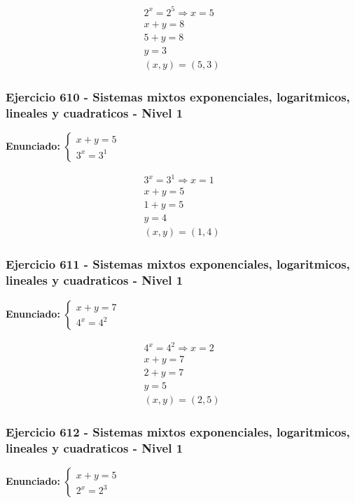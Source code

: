 \documentclass[12pt,a4paper]{article}
\begin{document}
\[
\begin{aligned}
2^x=2^{5}\Rightarrow x=5\\
x+y=8\\
5+y=8\\
y=3\\
\boxed{(x,y)=(5,3)}
\end{aligned}
\]


\subsubsection*{Ejercicio 610 - Sistemas mixtos exponenciales, logaritmicos, lineales y cuadraticos - Nivel 1}
\textbf{Enunciado:} \(\begin{cases} x+y=5\\ 3^x=3^{1}\end{cases}\)

\[
\begin{aligned}
3^x=3^{1}\Rightarrow x=1\\
x+y=5\\
1+y=5\\
y=4\\
\boxed{(x,y)=(1,4)}
\end{aligned}
\]


\subsubsection*{Ejercicio 611 - Sistemas mixtos exponenciales, logaritmicos, lineales y cuadraticos - Nivel 1}
\textbf{Enunciado:} \(\begin{cases} x+y=7\\ 4^x=4^{2}\end{cases}\)

\[
\begin{aligned}
4^x=4^{2}\Rightarrow x=2\\
x+y=7\\
2+y=7\\
y=5\\
\boxed{(x,y)=(2,5)}
\end{aligned}
\]


\subsubsection*{Ejercicio 612 - Sistemas mixtos exponenciales, logaritmicos, lineales y cuadraticos - Nivel 1}
\textbf{Enunciado:} \(\begin{cases} x+y=5\\ 2^x=2^{3}\end{cases}\)
\end{document}
